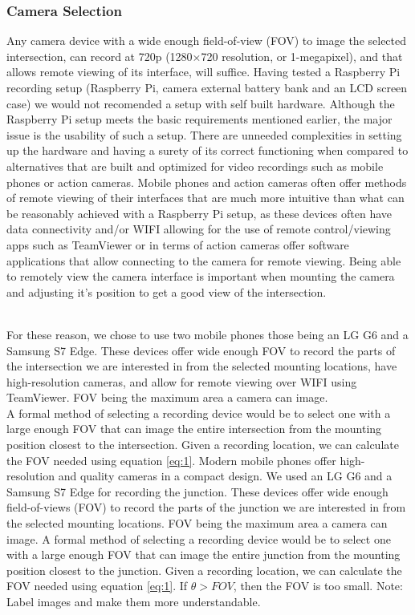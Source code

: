 \subsubsection{Camera Selection}

Any camera device with a wide enough field-of-view (FOV) to image the selected intersection, can record at 720p (1280×720 resolution, or 1-megapixel), and that allows remote viewing of its interface,
will suffice. Having tested a Raspberry Pi recording setup (Raspberry Pi, camera external battery bank and an LCD screen case) we would not recomended a setup with self built hardware.
Although the Raspberry Pi setup meets the basic requirements mentioned earlier, the major issue is the usability of such a setup. There are unneeded complexities in
setting up the hardware and having a surety of its correct functioning when compared to alternatives that are built and optimized for video recordings such as
mobile phones or action cameras. Mobile phones and action cameras often offer methods of remote viewing of their interfaces that are much more
intuitive than what can be reasonably achieved with a Raspberry Pi setup, as these devices often have data connectivity and/or WIFI allowing for the use of remote control/viewing apps such as TeamViewer or in terms of action cameras
offer software applications that allow connecting to the camera for remote viewing. Being able to remotely view the camera interface is important when mounting the
camera and adjusting it's position to get a good view of the intersection.

\ \\
For these reason, we chose to use two mobile phones those being an LG G6 and a Samsung S7 Edge.
These devices offer wide enough FOV to record the parts of the intersection we are interested in from the selected mounting locations, have high-resolution cameras, and allow for remote viewing over WIFI using TeamViewer.
FOV being the maximum area a camera can image. 
\ \\

A formal method of selecting a recording device would be to select one with a large enough FOV that can image the entire intersection from the mounting position closest to the intersection. Given a recording location, we can calculate the FOV needed using equation \ref{eq:1}.
Modern mobile phones offer high-resolution and quality cameras in a compact design. We used an LG G6 and a Samsung S7 Edge for recording the junction.
These devices offer wide enough field-of-views (FOV) to record the parts of the junction we are interested in from the selected mounting locations.
FOV being the maximum area a camera can image. A formal method of selecting a recording device would be to select one with a large enough FOV that can image the entire junction from the mounting position closest to the junction. Given a recording location, we can calculate the FOV needed using equation \ref{eq:1}.
If $\theta > FOV$, then the FOV is too small. 
\color{red}
Note: Label images and make them more understandable.
\color{black}

